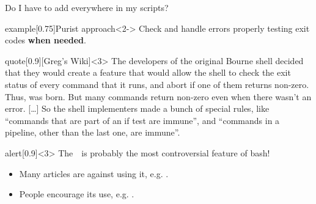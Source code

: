 \begin{frame}{Do I have to add \;\; everywhere in my scripts?}
    \vspace{-3mm}
    \begin{varblock}{example}[0.75\textwidth]{Purist approach}<2->
        Check and handle errors properly testing exit codes \textbf{when needed}.
    \end{varblock}
    \begin{varblock}{quote}[0.9\textwidth]{}[Greg's Wiki]<3>
        The developers of the original Bourne shell decided that they would create a feature that would allow the shell to check the exit status of every command that it runs, and abort if one of them returns non-zero.
        Thus,  was born.
        But many commands return non-zero even when there wasn't an error.
        [\ldots]
        So the shell implementers made a bunch of special rules, like ``commands that are part of an if test are immune'', and ``commands in a pipeline, other than the last one, are immune''.
    \end{varblock}
    \begin{varblock}{alert}[0.9\textwidth]{}<3>
        \alert{The \,\, is probably the most controversial feature of bash!}
    \end{varblock}
    \begin{itemize}[<3>]
        \item Many articles are against using it, e.g. .
        \item People encourage its use, e.g. .
    \end{itemize}
\end{frame}
